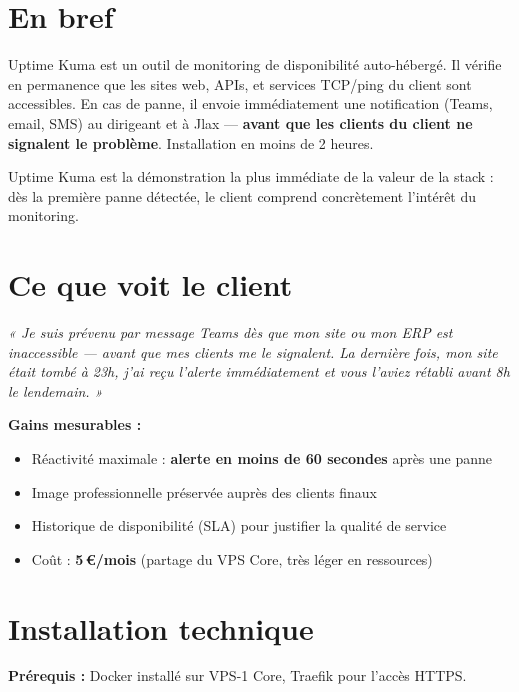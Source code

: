 \documentclass[11pt, a4paper]{article}
\begin{document}
\ficheHeader

\section*{En bref}
Uptime Kuma est un outil de monitoring de disponibilité auto-hébergé. Il vérifie en permanence que les sites web, APIs, et services TCP/ping du client sont accessibles. En cas de panne, il envoie immédiatement une notification (Teams, email, SMS) au dirigeant et à Jlax — \textbf{avant que les clients du client ne signalent le problème}. Installation en moins de 2 heures.

\begin{pointcle}
  Uptime Kuma est la démonstration la plus immédiate de la valeur de la stack : dès la première panne détectée, le client comprend concrètement l'intérêt du monitoring.
\end{pointcle}

\section{Ce que voit le client}

\begin{clientbox}
  \textit{« Je suis prévenu par message Teams dès que mon site ou mon ERP est inaccessible — avant que mes clients me le signalent. La dernière fois, mon site était tombé à 23h, j'ai reçu l'alerte immédiatement et vous l'aviez rétabli avant 8h le lendemain. »}
\end{clientbox}

\textbf{Gains mesurables :}
\begin{itemize}
  \item Réactivité maximale : \textbf{alerte en moins de 60 secondes} après une panne
  \item Image professionnelle préservée auprès des clients finaux
  \item Historique de disponibilité (SLA) pour justifier la qualité de service
  \item Coût : \textbf{5\,€/mois} (partage du VPS Core, très léger en ressources)
\end{itemize}

\section{Installation technique}

\textbf{Prérequis :} Docker installé sur VPS-1 Core, Traefik pour l'accès HTTPS.
\end{document}
